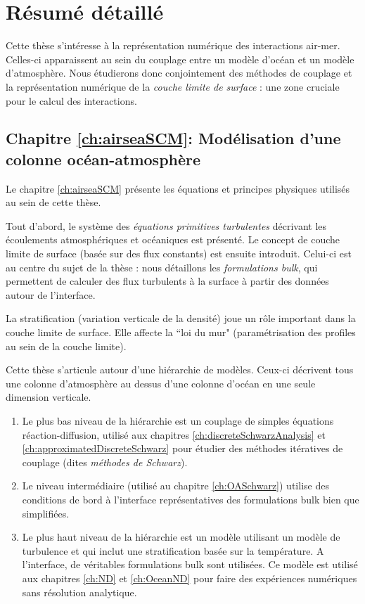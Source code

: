 \chapter*{Résumé détaillé}
Cette thèse s'intéresse à la représentation
numérique des interactions air-mer. Celles-ci apparaissent au sein
du couplage entre un modèle d'océan et un modèle d'atmosphère.
Nous étudierons donc conjointement des méthodes de couplage
et la représentation numérique de la
\textit{couche limite de surface} :
une zone cruciale pour le calcul des interactions.
\section*{Chapitre \ref{ch:airseaSCM}: Modélisation d'une colonne
océan-atmosphère}
Le chapitre \ref{ch:airseaSCM} présente les équations et
principes physiques utilisés
au sein de cette thèse.
\par
Tout d'abord, le système des \textit{équations primitives turbulentes}
décrivant les écoulements atmosphériques et océaniques est présenté.
Le concept de couche limite de surface
(basée sur des flux constants) est ensuite introduit.
Celui-ci est au centre du sujet de la thèse : nous détaillons les
\textit{formulations bulk}, qui permettent de calculer des flux
turbulents à la surface à partir des données autour de l'interface.
\par
La stratification (variation verticale de la densité) joue un rôle
important dans la couche limite de surface. Elle affecte la
``loi du mur" (paramétrisation des profiles au sein de la couche
limite).
\par
Cette thèse s'articule autour d'une hiérarchie de modèles. Ceux-ci
décrivent tous une colonne d'atmosphère au dessus d'une colonne
d'océan en une seule dimension verticale.
\par
\begin{enumerate}
	\item Le plus bas niveau de la hiérarchie est un couplage
	de simples équations réaction-diffusion, utilisé aux chapitres
		\ref{ch:discreteSchwarzAnalysis} et
		\ref{ch:approximatedDiscreteSchwarz} pour étudier des méthodes itératives de
		couplage (dites \textit{méthodes de Schwarz}).
	\item Le niveau intermédiaire (utilisé au chapitre \ref{ch:OASchwarz})
		utilise des conditions de bord
	à l'interface représentatives des formulations bulk bien
		que simplifiées.
\item Le plus haut niveau de la hiérarchie est un modèle utilisant
un modèle de turbulence et qui inclut une stratification basée sur
la température. A l'interface, de véritables formulations bulk
sont utilisées. Ce modèle est utilisé aux chapitres \ref{ch:ND}
	et \ref{ch:OceanND} pour
faire des expériences numériques sans résolution analytique.
\end{enumerate}
